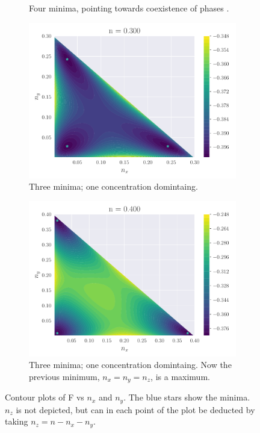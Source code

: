 \begin{figure}
\begin{subfigure}[b]{0.49\textwidth}
            \caption{Four minima, pointing towards coexistence of phases .}
        \end{subfigure}
        \begin{subfigure}[b]{0.49\textwidth}
            \includegraphics[width=\textwidth]{./figs/contour_nan_0.3.pdf}
            \caption{Three minima; one concentration domintaing. \linebreak }
        \end{subfigure}
        \begin{subfigure}[b]{0.49\textwidth}
            \includegraphics[width=\textwidth]{./figs/contour_nan_0.4.pdf}
            \caption{Three minima; one concentration domintaing. Now the previous minimum, $n_x = n_y = n_z$, is a maximum. }
        \end{subfigure}
        \caption{Contour plots of F vs $n_x$ and $n_y$. The blue stars show the minima. $n_z$ is not depicted, but can in each point of the plot be deducted by taking $n_z = n - n_x - n_y$.}
        \label{fig:cont}
    \end{figure}  
